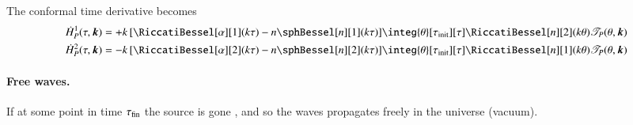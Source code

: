 
    The conformal time derivative becomes
    \begin{equation}
        \begin{split}
            \dot{H}_P^1(\tau, \vec{k})  &= +k \,\bclosed{ \RiccatiBessel[\alpha][1](k\tau) -  n\sphBessel[n][1](k\tau) } \integ{\theta}[\tau\ped{init}][\tau]  \RiccatiBessel[n][2](k\theta)  \Src_P(\theta, \vec{k})  \\
            \dot{H}_P^2(\tau, \vec{k})  &= -k \,\bclosed{ \RiccatiBessel[\alpha][2](k\tau) -  n\sphBessel[n][2](k\tau) } \integ{\theta}[\tau\ped{init}][\tau]  \RiccatiBessel[n][1](k\theta)  \Src_P(\theta, \vec{k})  
        \end{split}
    \end{equation}

    \paragraph{Free waves.} %
    If at some point in time $\tau_\mathrm{fin}$ the source is gone \blahblah, and so the waves propagates freely in the universe (vacuum).



